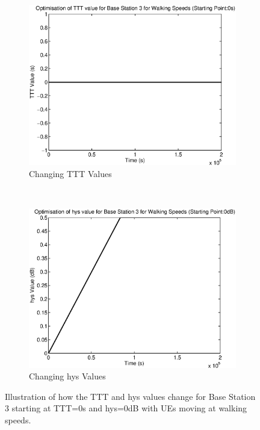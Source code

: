 \begin{figure}[H]
        \centering
        \begin{subfigure}[b]{0.49\textwidth}
                \includegraphics[width=\textwidth]{figures/graphs/walklow/TTT3.eps}
                \caption{Changing TTT Values}
        \end{subfigure}%
        ~ %
        \begin{subfigure}[b]{0.49\textwidth}
                \includegraphics[width=\textwidth]{figures/graphs/walklow/hys3.eps}
                \caption{Changing hys Values}
        \end{subfigure}
        \caption{Illustration of how the TTT and hys values change for Base Station 3 starting at TTT=0s and hys=0dB with UEs moving at walking speeds.}
\end{figure}
